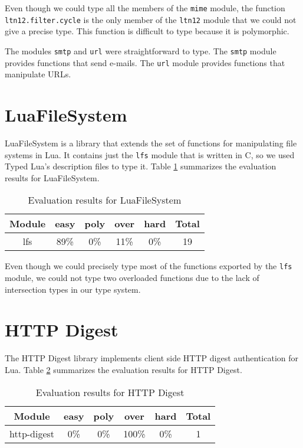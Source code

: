 Even though we could type all the members of the \texttt{mime} module,
the function \texttt{ltn12.filter.cycle} is the only member of the
\texttt{ltn12} module that we could not give a precise type.
This function is difficult to type because it is polymorphic.

The modules \texttt{smtp} and \texttt{url} were straightforward to type.
The \texttt{smtp} module provides functions that send e-mails.
The \texttt{url} module provides functions that manipulate URLs.

\section{LuaFileSystem}

LuaFileSystem is a library that extends the set of functions
for manipulating file systems in Lua.
It contains just the \texttt{lfs} module that is written in C,
so we used Typed Lua's description files to type it.
Table \ref{tab:evallfs} summarizes the evaluation results for LuaFileSystem.

\begin{table}[!ht]
\begin{center}
\begin{tabular}{|c|c|c|c|c|c|}
\hline
\textbf{Module} & \textbf{easy} & \textbf{poly} & \textbf{over} & \textbf{hard} & \textbf{Total} \\
\hline
lfs & 89\% & 0\% & 11\% & 0\% & 19 \\ %
\hline
\end{tabular}
\end{center}
\caption{Evaluation results for LuaFileSystem}
\label{tab:evallfs}
\end{table}

Even though we could precisely type most of the functions exported
by the \texttt{lfs} module, we could not type two overloaded functions
due to the lack of intersection types in our type system.

\section{HTTP Digest}

The HTTP Digest library implements client side HTTP digest authentication for Lua.
Table \ref{tab:evalhttpdigest} summarizes the evaluation results for HTTP Digest.

\begin{table}[!ht]
\begin{center}
\begin{tabular}{|c|c|c|c|c|c|}
\hline
\textbf{Module} & \textbf{easy} & \textbf{poly} & \textbf{over} & \textbf{hard} & \textbf{Total} \\
\hline
http-digest & 0\% & 0\% & 100\% & 0\% & 1 \\ %
\hline
\end{tabular}
\end{center}
\caption{Evaluation results for HTTP Digest}
\label{tab:evalhttpdigest}
\end{table}


